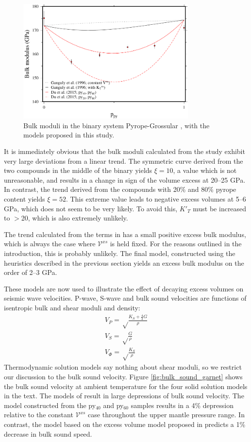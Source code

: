 \documentclass[review]{elsarticle}
\begin{document}
\begin{figure}[ht!]
  \centering
  \includegraphics[width=0.8\textwidth]{figures/pyrope_grossular_K_0}
  \caption{Bulk moduli in the binary system Pyrope-Grossular \citep{DCW2015}, with the models proposed in this study.}
  \label{fig:K_T_pyrope_grossular}
\end{figure}

It is immediately obvious that the bulk moduli calculated from the \cite{DCW2015} study exhibit very large deviations from a linear trend. The symmetric curve derived from the two compounds in the middle of the binary yields $\xi=10$, a value which is not unreasonable, and results in a change in sign of the volume excess at 20--25 GPa. In contrast, the trend derived from the compounds with 20\% and 80\% pyrope content yields $\xi=52$. This extreme value leads to negative excess volumes at 5--6 GPa, which does not seem to be very likely. To avoid this, $K'_T$ must be increased to $>$20, which is also extremely unlikely.

The trend calculated from the terms in \cite{GCT1996} has a small positive excess bulk modulus, which is always the case where $\mathcal{V}^{xs}$ is held fixed. For the reasons outlined in the introduction, this is probably unlikely. The final model, constructed using the heuristics described in the previous section yields an excess bulk modulus on the order of 2--3 GPa.

These models are now used to illustrate the effect of decaying excess volumes on seismic wave velocities. P-wave, S-wave and bulk sound velocities are functions of isentropic bulk and shear moduli and density:
\begin{eqnarray}
V_P = \sqrt \frac{K_S + \frac{4}{3} G }{\rho} \\
V_S = \sqrt \frac{G}{\rho} \\
V_\Phi = \sqrt \frac{K_S}{\rho}
\end{eqnarray}
Thermodynamic solution models say nothing about shear moduli, so we restrict our discussion to the bulk sound velocity. Figure \ref{fig:bulk_sound_garnet} shows the bulk sound velocity at ambient temperature for the four solid solution models in the text. The models of \cite{DCW2015} result in large depressions of bulk sound velocity. The model constructed from the py$_{40}$ and py$_{60}$ samples results in a 4\% depression relative to the constant $\mathcal{V}^{xs}$ case throughout the upper mantle pressure range. In contrast, the model based on the excess volume model proposed in \cite{GCT1996} predicts a 1\% decrease in bulk sound speed. 
\end{document}

